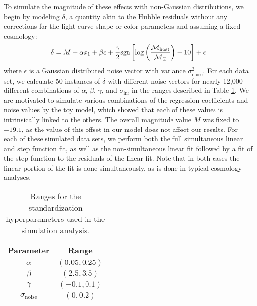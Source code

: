 To simulate the magnitude of these effects with non-Gaussian distributions, we begin by modeling $\delta$, a quantity akin to the Hubble residuals without any corrections for the light curve shape or color parameters and assuming a fixed cosmology:
\begin{equation}
    \delta= M + \alpha x_1 + \beta c + \frac{\gamma}{2}\text{sgn}\left[\log\left(\frac{\mathcal{M}_\text{host}}{\mathcal{M}_\odot}\right) - 10 \right] + \epsilon
\end{equation}
where $\epsilon$ is a Gaussian distributed noise vector with variance $\sigma_\text{noise}^2$. For each data set, we calculate 50 instances of $\delta$ with different noise vectors for nearly 12,000 different combinations of $\alpha$, $\beta$, $\gamma$, and $\sigma_\text{int}$ in the ranges described in Table \ref{tab:sim_ranges}. We are motivated to simulate various combinations of the regression coefficients and noise values by the toy model, which showed that each of these values is intrinsically linked to the others. The overall magnitude value $M$ was fixed to $-19.1$, as the value of this offset in our model does not affect our results. For each of these simulated data sets, we perform both the full simultaneous linear and step function fit, as well as the non-simultaneous linear fit followed by a fit of the step function to the residuals of the linear fit. Note that in both cases the linear portion of the fit is done simultaneously, as is done in typical cosmology analyses.
\begin{table}
    \centering
    \begin{tabular}{cc}
    \toprule
        Parameter & Range \\\midrule
        $\alpha$ & $(0.05, 0.25)$ \\
        $\beta$ & $(2.5, 3.5)$ \\
        $\gamma$ & $(-0.1, 0.1)$ \\
        $\sigma_\text{noise}$ & $(0, 0.2)$ \\
        \bottomrule
    \end{tabular}
    \caption{Ranges for the standardization hyperparameters used in the simulation analysis.}
    \label{tab:sim_ranges}
\end{table}

